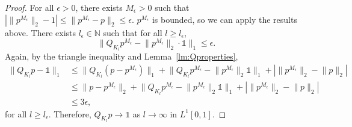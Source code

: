 \documentclass[a4paper]{article}
\theoremstyle{definition}
\numberwithin{equation}{section}
\numberwithin{theorem}{section}
\begin{document}
{\begin{proof}
    For all $\epsilon>0$, there exists $M_\epsilon>0$ such that $|\lVert p^{M_\epsilon}\rVert_2-1| \leq \lVert p^{M_\epsilon}-p\rVert_2 \leq \epsilon$. $p^{M_\epsilon}$ is bounded, so we can apply the results above. There exists $l_\epsilon\in\mathbb{N}$ such that for all $l\geq l_\epsilon$, 
    \begin{equation*}
        \lVert Q_{K_l} p^{M_\epsilon} -\lVert p^{M_\epsilon}\rVert_2\cdot\mathds{1}\rVert_1 \leq \epsilon.
    \end{equation*}
    Again, by the triangle inequality and Lemma~\ref{lm:Qproperties},
    \begin{align*}
        \lVert Q_{K_l} p -\mathds{1}\rVert_1 &\leq \lVert  Q_{K_l} (p -p^{M_\epsilon})\rVert_1 + \lVert  Q_{K_l} p^{M_\epsilon} -\lVert p^{M_\epsilon}\rVert_2\mathds{1}\rVert_1 + |\lVert p^{M_\epsilon}\rVert_2 - \lVert p \rVert_2|\\
        &\leq\lVert p-p^{M_\epsilon}\rVert_2 + \lVert  Q_{K_l} p^{M_\epsilon} -\lVert p^{M_\epsilon}\rVert_2\mathds{1}\rVert_1 + |\lVert p^{M_\epsilon}\rVert_2 - \lVert p \rVert_2|\\
        &\leq 3\epsilon,
    \end{align*}
    for all $l\geq l_\epsilon$. Therefore, $Q_{K_l} p\rightarrow\mathds{1}$ as $l\rightarrow\infty$ in $ L^1[0,1]$.
\end{proof}

}
\end{document}
